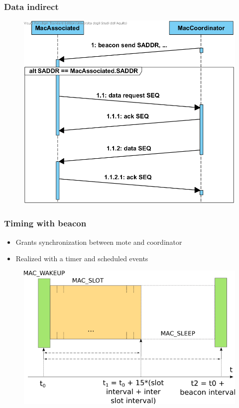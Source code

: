 \begin{frame}[fragile]
  \frametitle{Data indirect}
  \vspace{-2.7em}
  \begin{figure}
    \centering
    \includegraphics[width=.7\textwidth]{img/DataRequest.png}
  \end{figure}
\end{frame}

\begin{frame}[fragile]
  \frametitle{Timing with beacon}
  \begin{itemize}
    \item Grants synchronization between mote and coordinator
    \item Realized with a timer and scheduled events
  \end{itemize}
  \begin{figure}
    \centering
    \includegraphics[width=.7\textwidth]{img/MAC_STATES.png}
  \end{figure}
\end{frame}

